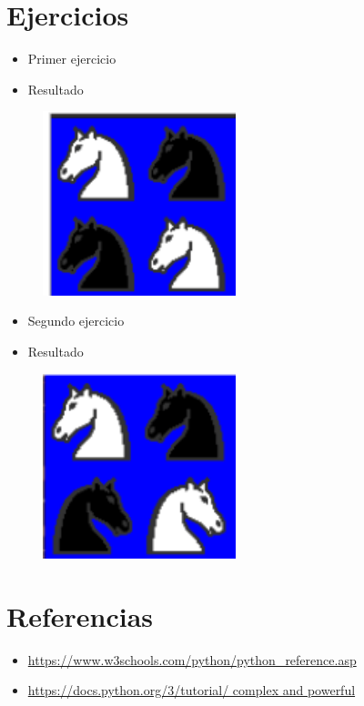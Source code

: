 \documentclass{article}
\begin{document}
\section{Ejercicios}
	\begin{itemize}
		\item Primer ejercicio
	\end{itemize}
	
	\begin{itemize}
		\item Resultado
	\end{itemize}
	\begin{figure}[H]
		\centering
		\includegraphics[width=0.5\textwidth,keepaspectratio]{img/Ejercicio2a.png}
	\end{figure}
	\begin{itemize}
		\item Segundo ejercicio
	\end{itemize}
	
	\begin{itemize}
		\item Resultado
	\end{itemize}
	\begin{figure}[H]
		\centering
		\includegraphics[width=0.5\textwidth,keepaspectratio]{img/Ejercicio2b.png}
	\end{figure}
\section{Referencias}
\begin{itemize}			
	\item \url{https://www.w3schools.com/python/python_reference.asp}
	\item\url{https://docs.python.org/3/tutorial/ complex and powerful}
\end{itemize}	
	
%
%
%
			
\end{document}
